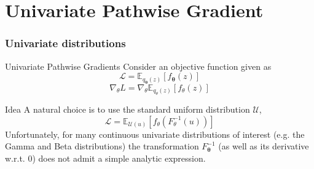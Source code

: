 \documentclass{beamer}
\begin{document}
\section{Univariate Pathwise Gradient}
\begin{frame}
    \frametitle{Univariate distributions}
    \begin{block}{Univariate Pathwise Gradients}
    Consider an objective function given as 
    $$\mathcal{L} = \mathbb{E}_{q_{\mathbf{\theta}}(z)} \left[ f_{\mathbf{\theta}}(z) \right]$$
$$\nabla_\theta L = \nabla_\theta \mathbb{E}_{q_\theta(z)} \left[ f_\theta(z) \right] $$
    \end{block}

    \begin{block}{Idea}
    A natural choice is to use the standard uniform distribution $\mathcal{U}$,
    $$\mathcal{L} = \mathbb{E}_{\mathcal{U}(u)} \left[ f_{\theta}(F_{\theta}^{-1}(u)) \right] $$
    Unfortunately, for many continuous univariate distributions of interest (e.g. the Gamma and Beta distributions) the transformation $F_\mathbf{\theta}^{-1}$ (as well as its derivative
w.r.t. 0) does not admit a simple analytic expression.
    \end{block}
\end{frame}
\end{document}
